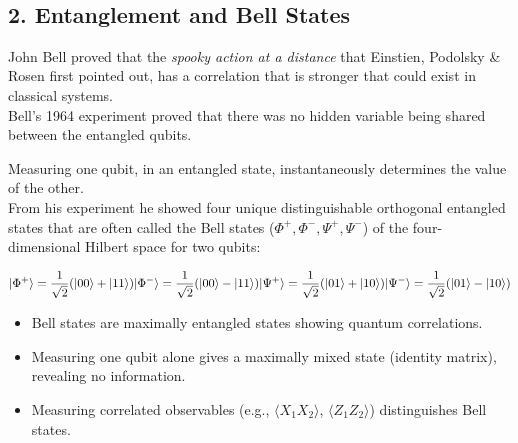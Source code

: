             
    
    \begin{center}
    \end{center}
    { \hspace*{\fill} \\}
    

    \hypertarget{entanglement-and-bell-states}{%
\subsection*{2. Entanglement and Bell
States}\label{entanglement-and-bell-states}}

John Bell proved that the \emph{spooky action at a distance} that
Einstien, Podolsky \& Rosen first pointed out, has a correlation that is
stronger that could exist in classical systems.\\
Bell's 1964 experiment proved that there was no hidden variable being
shared between the entangled qubits.

Measuring one qubit, in an entangled state, instantaneously determines
the value of the other.\\
From his experiment he showed four unique distinguishable orthogonal
entangled states that are often called the Bell states
(\(\Phi^+, \Phi^-, \Psi^+, \Psi^-\)) of the four-dimensional Hilbert
space for two qubits:

\[
\lvert \Phi^+\rangle = \frac{1}{\sqrt{2}}(\lvert 00\rangle + \lvert 11\rangle) \\
\lvert \Phi^-\rangle = \frac{1}{\sqrt{2}}(\lvert 00\rangle - \lvert 11\rangle) \\
\lvert \Psi^+\rangle = \frac{1}{\sqrt{2}}(\lvert 01\rangle + \lvert 10\rangle) \\
\lvert \Psi^-\rangle = \frac{1}{\sqrt{2}}(\lvert 01\rangle - \lvert 10\rangle)
\]

\begin{itemize}
\item
  Bell states are maximally entangled states showing quantum
  correlations.
\item
  Measuring one qubit alone gives a maximally mixed state (identity
  matrix), revealing no information.
\item
  Measuring correlated observables (e.g.,
  \(\langle X_1 X_2\rangle\)\hspace{0pt}, \(\langle Z_1 Z_2\rangle\))
  distinguishes Bell states.
\end{itemize}

